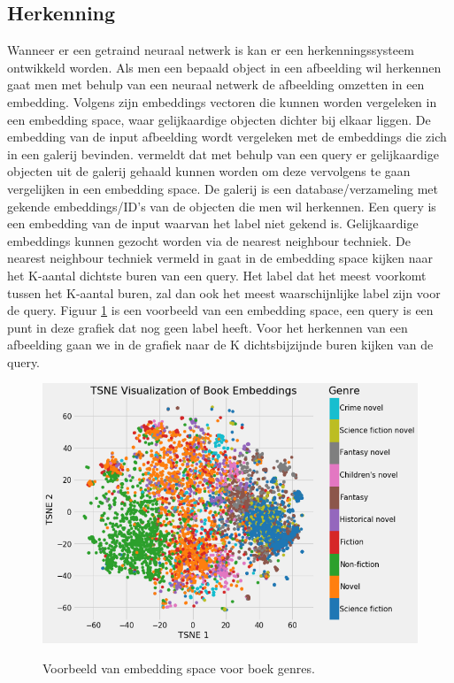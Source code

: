 \subsection{Herkenning}
Wanneer er een getraind neuraal netwerk is kan er een herkenningssysteem ontwikkeld worden. 
Als men een bepaald object in een afbeelding wil herkennen gaat men met behulp van een neuraal netwerk de afbeelding omzetten in een embedding. 
Volgens \cite{koehrsen_neural_2018} zijn embeddings vectoren die kunnen worden vergeleken in een embedding space, waar gelijkaardige objecten dichter bij elkaar liggen. 
De embedding van de input afbeelding wordt vergeleken met de embeddings die zich in een galerij bevinden. 
\cite{jiang_deep_2019} vermeldt dat met behulp van een query er gelijkaardige objecten uit de galerij gehaald kunnen worden om deze vervolgens te gaan vergelijken in een embedding space. 
De galerij is een database/verzameling met gekende embeddings/ID's van de objecten die men wil herkennen.
Een query is een embedding van de input waarvan het label niet gekend is.
Gelijkaardige embeddings kunnen gezocht worden via de nearest neighbour techniek.
De nearest neighbour techniek vermeld in \cite{8010421} gaat in de embedding space kijken naar het K-aantal dichtste buren van een query.
Het label dat het meest voorkomt tussen het K-aantal buren, zal dan ook het meest waarschijnlijke label zijn voor de query.
Figuur \ref{fig:embedding} is een voorbeeld van een embedding space, een query is een punt in deze grafiek dat nog geen label heeft.
Voor het herkennen van een afbeelding gaan we in de grafiek naar de K dichtsbijzijnde buren kijken van de query.

\begin{figure}[!ht]
    \centering
 	\includegraphics[width=0.7\linewidth]{fig/embedding.png}
 	\caption{Voorbeeld van embedding space voor boek genres.}
	\cite{koehrsen_neural_2018}
 	\label{fig:embedding}
\end{figure}

